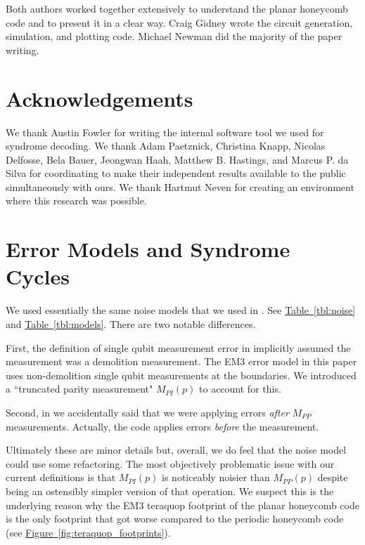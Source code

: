 \documentclass[onecolumn,unpublished,a4paper]{quantumarticle}
\theoremstyle{definition}
\theoremstyle{definition}
\theoremstyle{definition}
\newcommand{\fig}[1]{\hyperref[fig:#1]{Figure~\ref*{fig:#1}}}
\newcommand{\tbl}[1]{\hyperref[tbl:#1]{Table~\ref*{tbl:#1}}}
\begin{document}
Both authors worked together extensively to understand the planar honeycomb code and to present it in a clear way.
Craig Gidney wrote the circuit generation, simulation, and plotting code.
Michael Newman did the majority of the paper writing.

\section{Acknowledgements}

We thank Austin Fowler for writing the internal software tool we used for syndrome decoding.
We thank Adam Paetznick, Christina Knapp, Nicolas Delfosse, Bela Bauer, Jeongwan Haah, Matthew B. Hastings, and Marcus P. da Silva for coordinating to make their independent results available to the public simultaneously with ours.
We thank Hartmut Neven for creating an environment where this research was possible.




\appendix
\section{Error Models and Syndrome Cycles}
\label{app:noise}

We used essentially the same noise models that we used in \cite{gidney2021honeycombmemory}.
See \tbl{noise} and \tbl{models}.
There are two notable differences.

First, the definition of single qubit measurement error in \cite{gidney2021honeycombmemory} implicitly assumed the measurement was a demolition measurement.
The EM3 error model in this paper uses non-demolition single qubit measurements at the boundaries.
We introduced a ``truncated parity measurement" $M_{PI}(p)$ to account for this.

Second, in \cite{gidney2021honeycombmemory} we accidentally said that we were applying errors \emph{after} $M_{PP}$ measurements.
Actually, the code applies errors \emph{before} the measurement.

Ultimately these are minor details but, overall, we do feel that the noise model could use some refactoring.
The most objectively problematic issue with our current definitions is that $M_{PI}(p)$ is noticeably noisier than $M_{PP}(p)$ despite being an ostensibly simpler version of that operation.
We suspect this is the underlying reason why the EM3 teraquop footprint of the planar honeycomb code is the only footprint that got worse compared to the periodic honeycomb code (see \fig{teraquop_footprints}).
\end{document}
